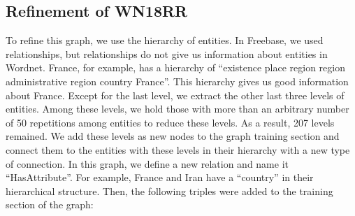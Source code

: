 \documentclass{article} \usepackage{iclr2022_conference,times}
\begin{document}
\subsection{Refinement of WN18RR}
To refine this graph, we use the hierarchy of entities. In Freebase, we used relationships, but relationships do not give us information about entities in Wordnet. France, for example, has a hierarchy of ``existence  place  region  region  administrative region  country  France''. This hierarchy gives us good information about France. Except for the last level, we extract the other last three levels of entities.  Among these levels, we hold those with more than an arbitrary number of 50 repetitions among entities to reduce these levels. As a result, 207 levels remained. We add these levels as new nodes to the graph training section and connect them to the entities with these levels in their hierarchy with a new type of connection. In this graph, we define a new relation and name it ``HasAttribute''. For example, France and Iran have a ``country'' in their hierarchical structure. Then, the following triples were added to the training section of the graph:
\end{document}
